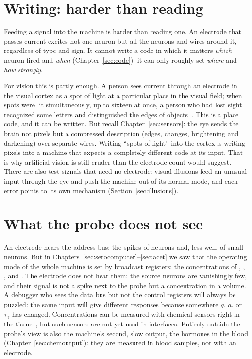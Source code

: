 \section{Writing: harder than reading}

Feeding a signal into the machine is harder than reading one. An electrode that passes current excites not one neuron but all the neurons and wires around it, regardless of type and sign. It cannot write a code in which it matters \emph{which} neuron fired and \emph{when} (Chapter~\ref{sec:code}); it can only roughly set \emph{where} and \emph{how strongly}.

For vision this is partly enough. A person sees current through an electrode in the visual cortex as a spot of light at a particular place in the visual field; when spots were lit simultaneously, up to sixteen at once, a person who had lost sight recognized some letters and distinguished the edges of objects~\cite{Fernandez2021}. This is a place code, and it can be written. But recall Chapter~\ref{sec:sensors}: the eye sends the brain not pixels but a compressed description (edges, changes, brightening and darkening) over separate wires. Writing ``spots of light'' into the cortex is writing pixels into a machine that expects a completely different code at its input. That is why artificial vision is still cruder than the electrode count would suggest. There are also test signals that need no electrode: visual illusions feed an unusual input through the eye and push the machine out of its normal mode, and each error points to its own mechanism (Section~\ref{sec:illusions}).

\section{What the probe does not see}

An electrode hears the address bus: the spikes of  neurons and, less well, of small  neurons. But in Chapters~\ref{sec:serocomputer}--\ref{sec:acet} we saw that the operating mode of the whole machine is set by broadcast registers: the concentrations of , , , and . The electrode does not hear them: the source neurons are vanishingly few, and their signal is not a spike next to the probe but a concentration in a volume. A debugger who sees the data bus but not the control registers will always be puzzled: the same input will give different responses because somewhere $g$, $a$, or $\tau_\gamma$ has changed. Concentrations can be measured with chemical sensors right in the tissue~\cite{Bunin1998}, but such sensors are not yet used in interfaces. Entirely outside the probe's view is also the machine's second, slow output, the hormones in the blood (Chapter~\ref{sec:chemoutput}): they are measured in blood samples, not with an electrode.

